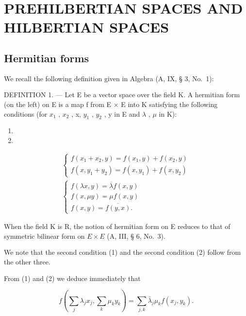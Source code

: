 \section{PREHILBERTIAN SPACES AND HILBERTIAN SPACES}

\subsection{Hermitian forms}

We recall the following definition given in Algebra (A, IX, § 3, No.~1):

DEFINITION 1. --- Let E be a vector space over the field K. A hermitian form (on the left) on E is a map f from E × E into K satisfying the following conditions (for \(x_{1}\) , \(x_{2}\) , x, \(y_{1}\) , \(y_{2}\) , y in E and \(\lambda\) , \(\mu\) in K):

\begin{enumerate}
\def\labelenumi{(\arabic{enumi})}
\tightlist
\item
\item
\end{enumerate}

\[
\begin{array}{c} \left\{ \begin{array}{l} f (x _ {1} + x _ {2}, y) = f (x _ {1}, y) + f (x _ {2}, y) \\ f (x, y _ {1} + y _ {2}) = f (x, y _ {1}) + f (x, y _ {2}) \end{array} \right. \\ \left\{ \begin{array}{l} f (\lambda x, y) = \overline {{\lambda}} f (x, y) \\ f (x, \mu y) = \mu f (x, y) \\ f (x, y) = \overline {{f (y , x)}}  . \end{array} \right. \end{array}\tag{3}
\]

When the field K is R, the notion of hermitian form on E reduces to that of symmetric bilinear form on \(E \times E\) (A, III, § 6, No.~3).

We note that the second condition (1) and the second condition (2) follow from the other three.

From (1) and (2) we deduce immediately that

\[
f \left(\sum_ {j} \lambda_ {j} x _ {j}, \sum_ {k} \mu_ {k} y _ {k}\right) = \sum_ {j, k} \bar {\lambda} _ {j} \mu_ {k} f \left(x _ {j}, y _ {k}\right).\tag{4}
\]

